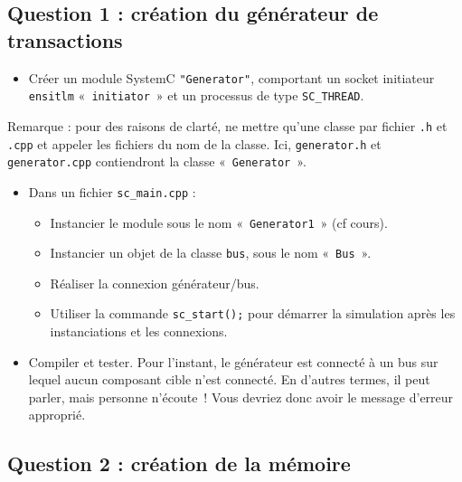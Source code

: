 \documentclass[12pt,a4paper]{article}
\begin{document}
\subsection*{Question 1 : création du générateur de transactions}

\begin{itemize}
\item Créer un module SystemC \texttt{"Generator"}, comportant un socket initiateur \verb|ensitlm| «~\texttt{initiator}~» et un processus de type \lstinline|SC_THREAD|.
\end{itemize}
\vv
Remarque : pour des raisons de clarté, ne mettre qu'une classe par fichier \verb|.h| et \verb|.cpp| et appeler les fichiers du nom de la classe.
Ici, \lstinline|generator.h| et \lstinline|generator.cpp| contiendront la classe « \lstinline|Generator| ».
\vv
\begin{itemize}
   \item Dans un fichier \lstinline|sc_main.cpp| :\vv
   \begin{itemize}
       \item Instancier le module sous le nom « \lstinline|Generator1| »  (cf cours).
       \item Instancier un objet de la classe \lstinline|bus|, sous le nom « \lstinline|Bus| ».
       \item Réaliser la connexion générateur/bus.
       \item Utiliser la commande \lstinline|sc_start();| pour démarrer la simulation après les instanciations et les connexions.
   \end{itemize}  
\end{itemize}
\vv
\begin{itemize}
\item Compiler et tester.
      Pour l'instant, le générateur est connecté à un bus sur lequel aucun composant cible n'est connecté.
      En d'autres termes, il peut parler, mais personne n'écoute~!
      Vous devriez donc avoir le message d'erreur approprié.
\end{itemize}

\subsection*{Question 2 : création de la mémoire}
\end{document}
